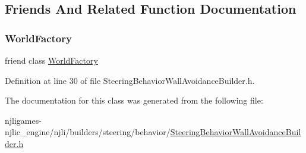 \subsection{Friends And Related Function Documentation}
\mbox{\label{classnjli_1_1_steering_behavior_wall_avoidance_builder_acb96ebb09abe8f2a37a915a842babfac}} 
\subsubsection{\texorpdfstring{World\+Factory}{WorldFactory}}
{\footnotesize\ttfamily friend class \mbox{\hyperlink{classnjli_1_1_world_factory}{World\+Factory}}\hspace{0.3cm}{\ttfamily [friend]}}



Definition at line 30 of file Steering\+Behavior\+Wall\+Avoidance\+Builder.\+h.



The documentation for this class was generated from the following file\+:\begin{DoxyCompactItemize}
\item 
njligames-\/njlic\+\_\+engine/njli/builders/steering/behavior/\mbox{\hyperlink{_steering_behavior_wall_avoidance_builder_8h}{Steering\+Behavior\+Wall\+Avoidance\+Builder.\+h}}\end{DoxyCompactItemize}
